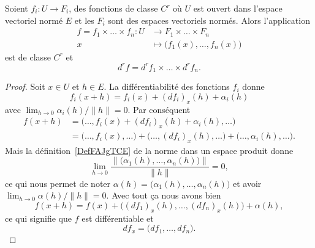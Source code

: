 \begin{proposition} \label{PropOYtgIua}
	Soient \( f_i\colon U\to F_i\), des fonctions de classe \( C^r\) où \( U\) est ouvert dans l'espace vectoriel normé \( E\) et les \( F_i\) sont des espaces vectoriels normés. Alors l'application
	\begin{equation}
		\begin{aligned}
			f=f_1\times \ldots\times f_n\colon U & \to F_1\times \ldots\times F_n            \\
			x                                    & \mapsto \big( f_1(x),\ldots, f_n(x) \big)
		\end{aligned}
	\end{equation}
	est de classe \( C^r\) et
	\begin{equation}
		d^rf=d^rf_1\times\ldots\times d^rf_n.
	\end{equation}
\end{proposition}

\begin{proof}
	Soit \( x\in U\) et \( h\in E\). La différentiabilité des fonctions \( f_i\) donne
	\begin{equation}
		f_i(x+h)=f_i(x)+(df_i)_x(h)+\alpha_i(h)
	\end{equation}
	avec \( \lim_{h\to 0} \alpha_i(h)/\| h \|=0\). Par conséquent
	\begin{subequations}
		\begin{align}
			f(x+h) & =\big( \ldots, f_i(x)+(df_i)_x(h)+\alpha_i(h),\ldots \big)                                                        \\
			       & = \big( \ldots,f_i(x),\ldots \big)+ \big( \ldots,(df_i)_x(h),\ldots \big)+ \big( \ldots,\alpha_i(h),\ldots \big).
		\end{align}
	\end{subequations}
	Mais la définition~\ref{DefFAJgTCE} de la norme dans un espace produit donne
	\begin{equation}
		\lim_{h\to 0} \frac{ \| \big( \alpha_1(h),\ldots, \alpha_n(h) \big) \| }{ \| h \| }=0,
	\end{equation}
	ce qui nous permet de noter \( \alpha(h)=\big( \alpha_1(h),\ldots, \alpha_n(h) \big)\) et avoir \( \lim_{h\to 0} \alpha(h)/\| h \|=0\). Avec tout ça nous avons bien
	\begin{equation}
		f(x+h)=f(x)+\big( (df_1)_x(h),\ldots ,(df_n)_x(h) \big)+\alpha(h),
	\end{equation}
	ce qui signifie que \( f\) est différentiable et
	\begin{equation}
		df_x=\big( df_1,\ldots, df_n \big).
	\end{equation}
\end{proof}

